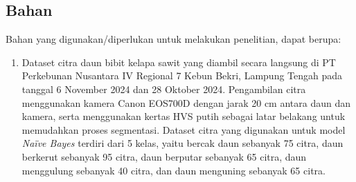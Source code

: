 \subsection{Bahan} \label{III.Bahan}
Bahan yang digunakan/diperlukan untuk melakukan penelitian, dapat berupa: \par
\begin{enumerate}[noitemsep]
	\item Dataset citra daun bibit kelapa sawit yang diambil secara langsung di PT Perkebunan Nusantara IV Regional 7 Kebun Bekri, Lampung Tengah pada tanggal 6 November 2024 dan 28 Oktober 2024. Pengambilan citra menggunakan kamera Canon EOS700D dengan jarak 20 cm antara daun dan kamera, serta menggunakan kertas HVS putih sebagai latar belakang untuk memudahkan proses segmentasi. Dataset citra yang digunakan untuk model \textit{Naïve Bayes} terdiri dari 5 kelas, yaitu bercak daun sebanyak 75 citra, daun berkerut sebanyak 95 citra, daun berputar sebanyak 65 citra, daun menggulung sebanyak 40 citra, dan daun menguning sebanyak 65 citra.
\end{enumerate}


